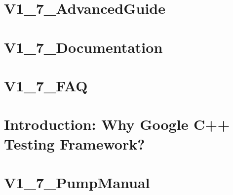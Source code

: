 \documentclass[twoside]{book}
\newcommand{\+}{\discretionary{\mbox{\scriptsize$\hookleftarrow$}}{}{}}
\begin{document}
\chapter{V1\+\_\+7\+\_\+\+Advanced\+Guide}
\label{md_smacc_sm_reference_library_sm_panda_moveit_libfranka_3rdparty_googletest_googletest_docs_V1_7_AdvancedGuide}

\chapter{V1\+\_\+7\+\_\+\+Documentation}
\label{md_smacc_sm_reference_library_sm_panda_moveit_libfranka_3rdparty_googletest_googletest_docs_V1_7_Documentation}

\chapter{V1\+\_\+7\+\_\+\+F\+AQ}
\label{md_smacc_sm_reference_library_sm_panda_moveit_libfranka_3rdparty_googletest_googletest_docs_V1_7_FAQ}

\chapter{Introduction\+: Why Google C++ Testing Framework?}
\label{md_smacc_sm_reference_library_sm_panda_moveit_libfranka_3rdparty_googletest_googletest_docs_V1_7_Primer}

\chapter{V1\+\_\+7\+\_\+\+Pump\+Manual}
\label{md_smacc_sm_reference_library_sm_panda_moveit_libfranka_3rdparty_googletest_googletest_docs_V1_7_PumpManual}

\end{document}
